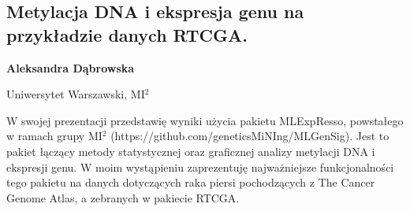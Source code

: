 \documentclass[\main/boa.tex]{subfiles}
\begin{document}
\subsection{Metylacja DNA i ekspresja genu na przykładzie danych RTCGA.}

\begin{minipage}{0.915\textwidth}
	\centering
  {\bf {} Aleksandra Dąbrowska}
\end{minipage}


\begin{affiliations}
\begin{minipage}{0.915\textwidth}
\centering
Uniwersytet Warszawski, MI$^{2}$ \\[-2pt]
\end{minipage}
\end{affiliations}

\vskip 0.3cm

W swojej prezentacji przedstawię wyniki użycia pakietu MLExpResso, powstałego w ramach grupy MI$^{2}$  (https://github.com/geneticsMiNIng/MLGenSig). Jest to pakiet łączący metody statystycznej oraz graficznej analizy metylacji DNA i ekspresji genu. W moim wystąpieniu zaprezentuję najważniejsze funkcjonalności tego pakietu na danych dotyczących raka piersi pochodzących z The Cancer Genome Atlas, a zebranych w pakiecie RTCGA. 
\end{document}
